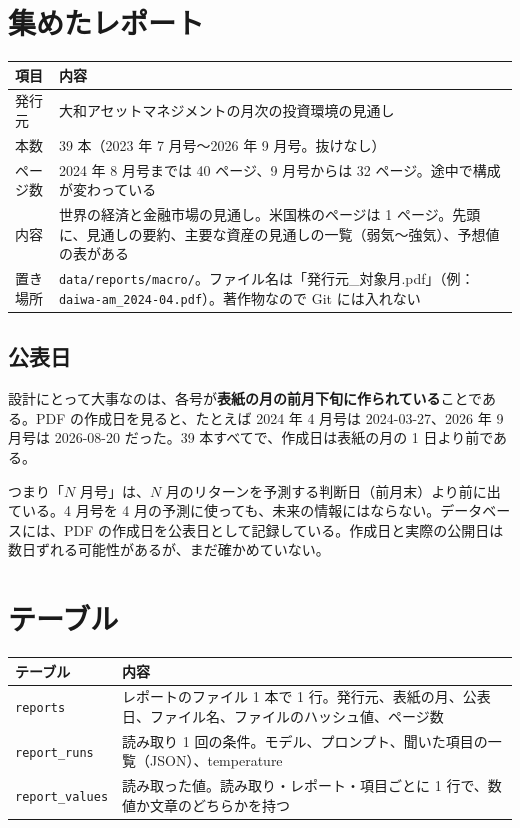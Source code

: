 \documentclass[xelatex,ja=standard,jafont=hiragino-pron,a4paper,10pt]{bxjsreport}
\newcommand{\code}[1]{\texttt{#1}}
\begin{document}
\section{集めたレポート}

\begin{longtable}{p{3.40cm}p{11.00cm}}
\toprule
\textbf{項目} & \textbf{内容} \\
\midrule
\endfirsthead
\bottomrule
\endfoot
発行元 & 大和アセットマネジメントの月次の投資環境の見通し \\
本数 & 39 本（2023 年 7 月号〜2026 年 9 月号。抜けなし） \\
ページ数 & 2024 年 8 月号までは 40 ページ、9 月号からは 32 ページ。途中で構成が変わっている \\
内容 & 世界の経済と金融市場の見通し。米国株のページは 1 ページ。先頭に、見通しの要約、主要な資産の見通しの一覧（弱気〜強気）、予想値の表がある \\
置き場所 & \code{data/reports/macro/}。ファイル名は「発行元\_対象月.pdf」（例：\code{daiwa-am\_2024-04.pdf}）。著作物なので Git には入れない \\
\end{longtable}

\subsection{公表日}

設計にとって大事なのは、各号が\textbf{表紙の月の前月下旬に作られている}ことである。PDF の作成日を見ると、たとえば 2024 年 4 月号は 2024-03-27、2026 年 9 月号は 2026-08-20 だった。39 本すべてで、作成日は表紙の月の 1 日より前である。

つまり「$N$ 月号」は、$N$ 月のリターンを予測する判断日（前月末）より前に出ている。4 月号を 4 月の予測に使っても、未来の情報にはならない。データベースには、PDF の作成日を公表日として記録している。作成日と実際の公開日は数日ずれる可能性があるが、まだ確かめていない。

\section{テーブル}

\begin{longtable}{p{3.20cm}p{11.20cm}}
\toprule
\textbf{テーブル} & \textbf{内容} \\
\midrule
\endfirsthead
\bottomrule
\endfoot
\code{reports} & レポートのファイル 1 本で 1 行。発行元、表紙の月、公表日、ファイル名、ファイルのハッシュ値、ページ数 \\
\code{report\_runs} & 読み取り 1 回の条件。モデル、プロンプト、聞いた項目の一覧（JSON）、temperature \\
\code{report\_values} & 読み取った値。読み取り・レポート・項目ごとに 1 行で、数値か文章のどちらかを持つ \\
\end{longtable}
\end{document}
